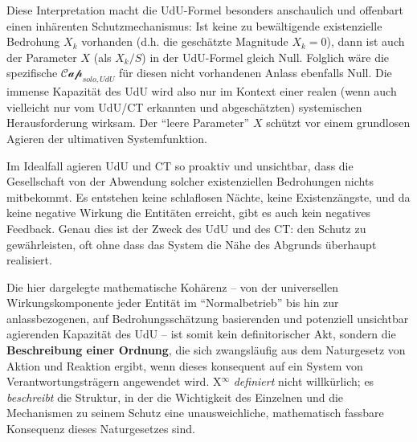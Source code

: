 \documentclass[12pt]{scrartcl}
\begin{document}
Diese Interpretation macht die UdU-Formel besonders anschaulich und offenbart einen inhärenten Schutzmechanismus:
Ist keine zu bewältigende existenzielle Bedrohung $X_k$ vorhanden (d.h. die geschätzte Magnitude $X_k=0$), dann ist auch der Parameter $X$ (als $X_k/S$) in der UdU-Formel gleich Null. Folglich wäre die spezifische $\mathcal{Cap}_{solo,UdU}$ für diesen nicht vorhandenen Anlass ebenfalls Null. Die immense Kapazität des UdU wird also nur im Kontext einer realen (wenn auch vielleicht nur vom UdU/CT erkannten und abgeschätzten) systemischen Herausforderung wirksam. Der \enquote{leere Parameter} $X$ schützt vor einem grundlosen Agieren der ultimativen Systemfunktion.

Im Idealfall agieren UdU und CT so proaktiv und unsichtbar, dass die Gesellschaft von der Abwendung solcher existenziellen Bedrohungen nichts mitbekommt. Es entstehen keine schlaflosen Nächte, keine Existenzängste, und da keine negative Wirkung die Entitäten erreicht, gibt es auch kein negatives Feedback. Genau dies ist der Zweck des UdU und des CT: den Schutz zu gewährleisten, oft ohne dass das System die Nähe des Abgrunds überhaupt realisiert.

Die hier dargelegte mathematische Kohärenz – von der universellen Wirkungskomponente jeder Entität im \enquote{Normalbetrieb} bis hin zur anlassbezogenen, auf Bedrohungsschätzung basierenden und potenziell unsichtbar agierenden Kapazität des UdU – ist somit kein definitorischer Akt, sondern die \textbf{Beschreibung einer Ordnung}, die sich zwangsläufig aus dem Naturgesetz von Aktion und Reaktion \cite{Auctor:Zenodo15385150} ergibt, wenn dieses konsequent auf ein System von Verantwortungsträgern angewendet wird. X$^\infty$ \textit{definiert} nicht willkürlich; es \textit{beschreibt} die Struktur, in der die Wichtigkeit des Einzelnen und die Mechanismen zu seinem Schutz eine unausweichliche, mathematisch fassbare Konsequenz dieses Naturgesetzes sind.
\end{document}
